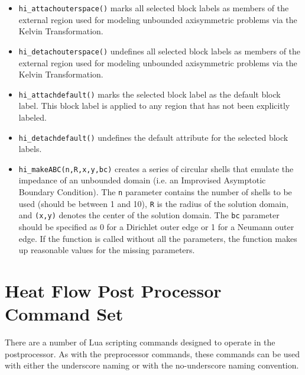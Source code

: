 \begin{itemize}
\item{\tt hi\_attachouterspace()} marks all
selected block labels as members of the external region used for
modeling unbounded axisymmetric problems via the Kelvin
Transformation.

\item{\tt hi\_detachouterspace()} undefines all selected block labels
as members of the external region used for modeling unbounded axisymmetric
problems via the Kelvin Transformation.

\item{\tt hi\_attachdefault()} marks the
selected block label as the default block label.  This block label
is applied to any region that has not been explicitly labeled.

\item{\tt hi\_detachdefault()} undefines the default
attribute for the selected block labels.

\item{\tt hi\_makeABC(n,R,x,y,bc)} creates a series of circular shells that emulate the
impedance of an unbounded domain (i.e. an Improvised Asymptotic Boundary
Condition).  The {\tt n} parameter contains the number of shells to be used
(should be between 1 and 10), {\tt R} is the radius of the solution domain, and
{\tt (x,y)} denotes the center of the solution domain.  The {\tt bc} parameter should
be specified as 0 for a Dirichlet outer edge or 1 for a Neumann outer edge.
If the function is called without all the parameters, the function makes up
reasonable values for the missing parameters. 

\end{itemize}

\section{Heat Flow Post Processor Command Set}

There are a number of Lua scripting commands designed to operate in
the postprocessor. As with the preprocessor commands, these
commands can be used with either the underscore naming or with the
no-underscore naming convention.

